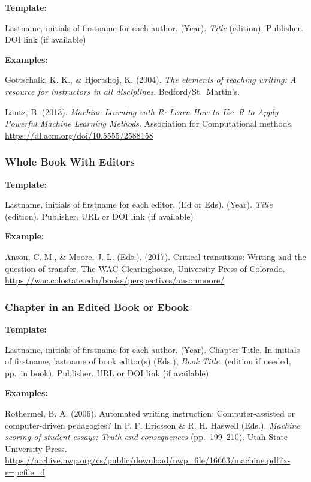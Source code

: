 \documentclass[
]{book}
\begin{document}
\textbf{Template:}

Lastname, initials of firstname for each author. (Year). \emph{Title} (edition). Publisher. DOI link (if available)

\textbf{Examples:}

Gottschalk, K. K., \& Hjortshoj, K. (2004). \emph{The elements of teaching writing: A resource for instructors in all disciplines}. Bedford/St.~Martin's.

Lantz, B. (2013). \emph{Machine Learning with R: Learn How to Use R to Apply Powerful Machine Learning Methods}. Association for Computational methods. \url{https://dl.acm.org/doi/10.5555/2588158}

\hypertarget{whole-book-with-editors}{%
\subsubsection{Whole Book With Editors}\label{whole-book-with-editors}}

\textbf{Template:}

Lastname, initials of firstname for each editor. (Ed or Eds). (Year). \emph{Title} (edition). Publisher. URL or DOI link (if available)

\textbf{Example:}

Anson, C. M., \& Moore, J. L. (Eds.). (2017). Critical transitions: Writing and the question of transfer. The WAC Clearinghouse, University Press of Colorado. \url{https://wac.colostate.edu/books/perspectives/ansonmoore/}

\hypertarget{chapter-in-an-edited-book-or-ebook}{%
\subsubsection{Chapter in an Edited Book or Ebook}\label{chapter-in-an-edited-book-or-ebook}}

\textbf{Template:}

Lastname, initials of firstname for each author. (Year). Chapter Title. In initials of firstname, lastname of book editor(s) (Eds.), \emph{Book Title}. (edition if needed, pp.~in book). Publisher. URL or DOI link (if available)

\textbf{Examples:}

Rothermel, B. A. (2006). Automated writing instruction: Computer-assisted or computer-driven pedagogies? In P. F. Ericsson \& R. H. Haswell (Eds.), \emph{Machine scoring of student essays: Truth and consequences} (pp.~199--210). Utah State University Press. \url{https://archive.nwp.org/cs/public/download/nwp_file/16663/machine.pdf?x-r=pcfile_d}
\end{document}
